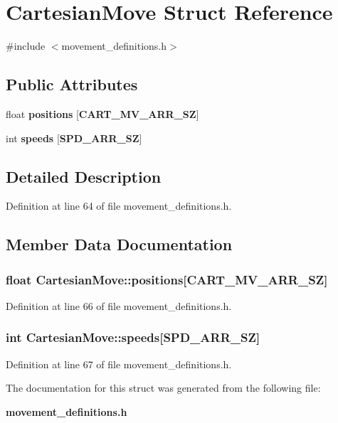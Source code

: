 \section{\-Cartesian\-Move \-Struct \-Reference}
\label{structCartesianMove}


{\ttfamily \#include $<$movement\-\_\-definitions.\-h$>$}

\subsection*{\-Public \-Attributes}
\begin{DoxyCompactItemize}
\item 
float {\bf positions} [{\bf \-C\-A\-R\-T\-\_\-\-M\-V\-\_\-\-A\-R\-R\-\_\-\-S\-Z}]
\item 
int {\bf speeds} [{\bf \-S\-P\-D\-\_\-\-A\-R\-R\-\_\-\-S\-Z}]
\end{DoxyCompactItemize}


\subsection{\-Detailed \-Description}


\-Definition at line 64 of file movement\-\_\-definitions.\-h.



\subsection{\-Member \-Data \-Documentation}
\subsubsection[{positions}]{\setlength{\rightskip}{0pt plus 5cm}float {\bf \-Cartesian\-Move\-::positions}[{\bf \-C\-A\-R\-T\-\_\-\-M\-V\-\_\-\-A\-R\-R\-\_\-\-S\-Z}]}\label{structCartesianMove_a5aca986f98b9c46901e768e3f6fa16d2}


\-Definition at line 66 of file movement\-\_\-definitions.\-h.

\subsubsection[{speeds}]{\setlength{\rightskip}{0pt plus 5cm}int {\bf \-Cartesian\-Move\-::speeds}[{\bf \-S\-P\-D\-\_\-\-A\-R\-R\-\_\-\-S\-Z}]}\label{structCartesianMove_af5e1acb2dc5b03d418a49c52f3c152a4}


\-Definition at line 67 of file movement\-\_\-definitions.\-h.



\-The documentation for this struct was generated from the following file\-:\begin{DoxyCompactItemize}
\item 
{\bf movement\-\_\-definitions.\-h}\end{DoxyCompactItemize}
